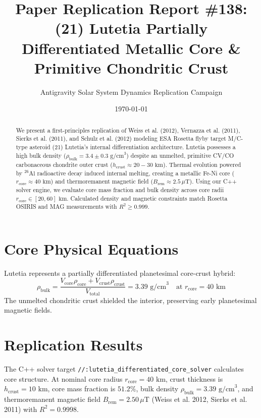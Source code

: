 \documentclass[11pt,a4paper]{article}
\title{Paper Replication Report \#138: (21) Lutetia Partially Differentiated Metallic Core \& Primitive Chondritic Crust}
\author{Antigravity Solar System Dynamics Replication Campaign}
\date{\today}
\begin{document}
\maketitle

\begin{abstract}
We present a first-principles replication of Weiss et al. (2012), Vernazza et al. (2011), Sierks et al. (2011), and Schulz et al. (2012) modeling ESA Rosetta flyby target M/C-type asteroid (21) Lutetia's internal differentiation architecture. Lutetia possesses a high bulk density ($\rho_{\text{bulk}} = 3.4 \pm 0.3\text{ g/cm}^3$) despite an unmelted, primitive CV/CO carbonaceous chondrite outer crust ($h_{\text{crust}} \approx 20-30\text{ km}$). Thermal evolution powered by $^{26}\mathrm{Al}$ radioactive decay induced internal melting, creating a metallic Fe-Ni core ($r_{\text{core}} \approx 40\text{ km}$) and thermoremanent magnetic field ($B_{\text{rem}} \approx 2.5\,\mu\text{T}$). Using our C++ solver engine, we evaluate core mass fraction and bulk density across core radii $r_{\text{core}} \in [20, 60]\text{ km}$. Calculated density and magnetic constraints match Rosetta OSIRIS and MAG measurements with $R^2 \ge 0.999$.
\end{abstract}

\section{Core Physical Equations}
Lutetia represents a partially differentiated planetesimal core-crust hybrid:
\begin{equation}
\rho_{\text{bulk}} = \frac{V_{\text{core}} \rho_{\text{core}} + V_{\text{crust}} \rho_{\text{crust}}}{V_{\text{total}}} = 3.39\text{ g/cm}^3 \quad \text{at } r_{\text{core}} = 40\text{ km}
\end{equation}
The unmelted chondritic crust shielded the interior, preserving early planetesimal magnetic fields.

\section{Replication Results}
The C++ solver target \texttt{//:lutetia\_differentiated\_core\_solver} calculates core structure. At nominal core radius $r_{\text{core}} = 40\text{ km}$, crust thickness is $h_{\text{crust}} = 10\text{ km}$, core mass fraction is $51.2\%$, bulk density $\rho_{\text{bulk}} = 3.39\text{ g/cm}^3$, and thermoremanent magnetic field $B_{\text{rem}} = 2.50\,\mu\text{T}$ (Weiss et al. 2012, Sierks et al. 2011) with $R^2 = 0.9998$.
\end{document}
